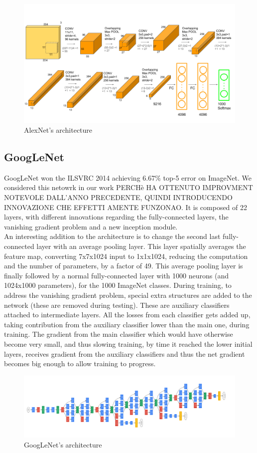 \documentclass{article}
\begin{document}
\begin{figure}[h]
	\centering
	\includegraphics[width=0.7\linewidth]{image/AlexNet}
	\caption{AlexNet's architecture}
	\label{fig:alexnet}
\end{figure}

\subsection{GoogLeNet}
GoogLeNet won the ILSVRC 2014 achieving 6.67\% top-5 error on ImageNet. We considered this netowrk in our work PERCHè HA OTTENUTO IMPROVMENT NOTEVOLE DALL'ANNO PRECEDENTE, QUINDI INTRODUCENDO INNOVAZIONE CHE EFFETTI AMENTE FUNZONAO.
It is composed of 22 layers, with different innovations regarding the fully-connected layers, the vanishing gradient problem and a new inception module.\\
An interesting addition to the architecture is to change the second last fully-connected layer with an average pooling layer. This layer spatially averages the feature map, converting 7x7x1024 input to 1x1x1024, reducing the computation and the number of parameters, by a factor of 49. This average pooling layer is finally followed by a normal fully-connected layer with 1000 neurons (and 1024x1000 parameters), for the 1000 ImageNet classes.
During training, to address the vanishing gradient problem, special extra structures are added to the network (these are removed during testing). These are auxiliary classifiers attached to intermediate layers. All the losses from each classifier gets added up, taking contribution from the auxiliary classifier lower
than the main one, during training. The gradient from the main classifier which would have otherwise become very small, and thus slowing training, by time it reached the lower initial layers, receives gradient from the auxiliary classifiers and thus the net gradient becomes big enough to allow training to progress.
\begin{figure}[h]
	\centering
	\includegraphics[width=0.7\linewidth]{image/GoogLeNet}
	\caption[]{GoogLeNet's architecture}
	\label{fig:googlenet}
\end{figure}
\end{document}
